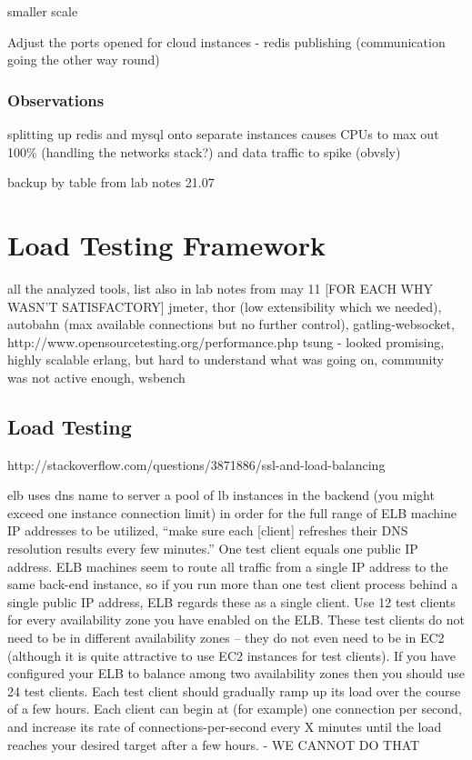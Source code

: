 \documentclass{uvamscse}
\begin{document}
smaller scale

Adjust the ports opened for cloud instances - redis publishing (communication going the other way round)

\subsubsection{Observations}

splitting up redis and mysql onto separate instances causes CPUs to max out 100\% (handling the networks stack?) and data traffic to spike (obvsly)

backup by table from lab notes 21.07

\section{Load Testing Framework}\label{Load Testing Framework}
all the analyzed tools, list also in lab notes from may 11 [FOR EACH WHY WASN'T SATISFACTORY]
jmeter, thor (low extensibility which we needed), autobahn (max available connections but no further control),
gatling-websocket, http://www.opensourcetesting.org/performance.php
tsung - looked promising, highly scalable erlang, but hard to understand what was going on, community was not active enough, wsbench


\subsection{Load Testing}
http://stackoverflow.com/questions/3871886/ssl-and-load-balancing

elb uses dns name to server a pool of lb instances in the backend (you might exceed one instance connection limit)
in order for the full range of ELB machine IP addresses to be utilized, “make sure each [client] refreshes their DNS resolution results every few minutes.”
One test client equals one public IP address. ELB machines seem to route all traffic from a single IP address to the same back-end instance, so if you run more than one test client process behind a single public IP address, ELB regards these as a single client.
Use 12 test clients for every availability zone you have enabled on the ELB. These test clients do not need to be in different availability zones – they do not even need to be in EC2 (although it is quite attractive to use EC2 instances for test clients). If you have configured your ELB to balance among two availability zones then you should use 24 test clients.
Each test client should gradually ramp up its load over the course of a few hours. Each client can begin at (for example) one connection per second, and increase its rate of connections-per-second every X minutes until the load reaches your desired target after a few hours. - WE CANNOT DO THAT
\end{document}
